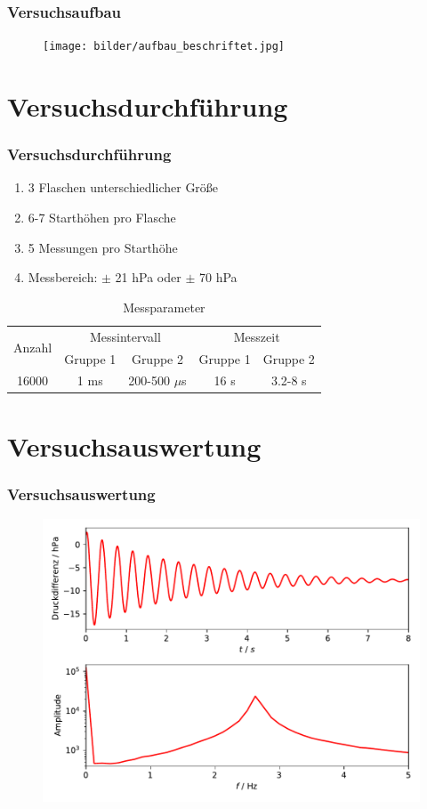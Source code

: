 \documentclass{beamer}
\begin{document}
\begin{frame}
\frametitle{Versuchsaufbau}
\begin{figure}
\texttt{[image: bilder/aufbau\_beschriftet.jpg]}
\end{figure}
\end{frame}


\section{Versuchsdurchführung}

\begin{frame}
\frametitle{Versuchsdurchführung}

\begin{enumerate}[-]
\item 3 Flaschen unterschiedlicher Größe
\item 6-7 Starthöhen pro Flasche
\item 5 Messungen pro Starthöhe
\item Messbereich: $\pm$ 21 hPa oder $\pm$ 70 hPa
\end{enumerate}

\begin{table}
\begin{tabular}{|c|c|c|c|c|}
\hline
\multirow{2}{*}{Anzahl} & \multicolumn{2}{c|}{Messintervall} & \multicolumn{2}{c|}{Messzeit} \\
\cline{2-5}
& Gruppe 1 & Gruppe 2 & Gruppe 1 & Gruppe 2 \\
\hline
16000 & 1 ms & 200-500 $\mu$s & 16 s & 3.2-8 s \\
\hline
\end{tabular}
\caption{Messparameter}
\end{table}
\end{frame}

\section{Versuchsauswertung}

\begin{frame}
\frametitle{Versuchsauswertung}
\begin{figure}
\includegraphics[width=.9\linewidth]{plots/rohdaten_log.pdf}
\end{figure}
\end{frame}
\end{document}

